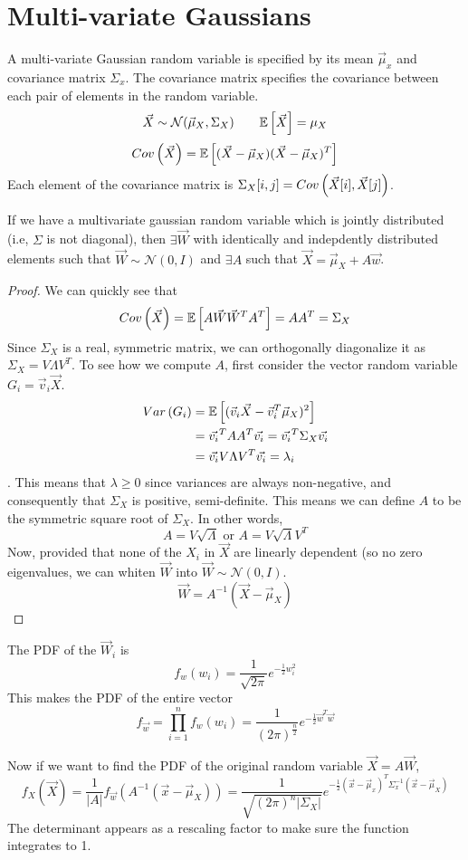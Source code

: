 \section{Multi-variate Gaussians}
A multi-variate Gaussian random variable is specified by its mean $\vec{\mu}_x$ and covariance matrix $\Sigma_x$. The covariance matrix specifies the covariance between each pair of elements in the random variable.
\[\vec{X}\sim\mathcal{N}(\vec{\mu}_X, \Sigma_X) \qquad \mathbb{E}\left[\vec{X}\right] = \mu_{X}\]
\[Cov\left(\vec{X}\right) = \mathbb{E}\left[(\vec{X}-\vec{\mu}_X)(\vec{X}-\vec{\mu}_X)^T\right]\]
Each element of the covariance matrix is $\Sigma_X[i, j] = Cov\left(\vec{X}[i], \vec{X}[j]\right)$.
\begin{theorem}
  If we have a multivariate gaussian random variable which is jointly distributed (i.e, $\Sigma$ is not diagonal), then $\exists \vec{W}$ with identically and indepdently distributed elements such that $\vec{W}\sim\mathcal{N}(0, I)$ and $\exists A$ such that $\vec{X} = \vec{\mu}_X+A\vec{w}$.
  \label{thm:mvn}
\end{theorem}
\begin{proof}
We can quickly see that
$$Cov\left(\vec{X}\right)=\mathbb{E}\left[A\vec{W}\vec{W}^TA^T\right] = AA^T=\Sigma_X$$
Since $\Sigma_X$ is a real, symmetric matrix, we can orthogonally diagonalize it as $\Sigma_X = V\Lambda V^T$. To see how we compute $A$, first consider the vector random variable $G_i=\vec{v}_i\vec{X}$.
\begin{align*}
  Var\left(G_i\right) &= \mathbb{E}\left[(\vec{v}_i\vec{X}-\vec{v}_i^T\vec{\mu}_X)^2\right] \\
  &= \vec{v_i}^TAA^T\vec{v_i} =\vec{v_i}^T\Sigma_X\vec{v_i}\\
  &= \vec{v_i}V\Lambda V^T\vec{v_i} = \lambda_i
\end{align*}.
This means that $\lambda \geq 0$ since variances are always non-negative, and consequently that $\Sigma_X$ is positive, semi-definite. This means we can define $A$ to be the symmetric square root of $\Sigma_X$. In other words,
\[
  A = V\sqrt{\Lambda} \text{ or } A = V\sqrt{\Lambda}V^T
\]
Now, provided that none of the $X_i$ in $\vec{X}$ are linearly dependent (so no zero eigenvalues, we can whiten $\vec{W}$ into $\vec{W}\sim\mathcal{N}(0, I)$.
\[
  \vec{W} = A^{-1}(\vec{X}-\vec{\mu}_X)
\]
\end{proof}
The PDF of the $\vec{W}_i$ is 
\[
  f_{w}(w_i)=\frac{1}{\sqrt{2\pi}}e^{-\frac{1}{2}w_i^2}
\]
This makes the PDF of the entire vector
\[
  f_{\vec{w}} = \prod_{i=1}^nf_w(w_i) = \frac{1}{(2\pi)^{\frac{n}{2}}}e^{-\frac{1}{2}\vec{w}^T\vec{w}}
\]

Now if we want to find the PDF of the original random variable $\vec{X} = A\vec{W}$,
\[
  f_{X}(\vec{X}) = \frac{1}{|A|}f_{\vec{w}}(A^{-1}(\vec{x}-\vec{\mu}_X)) = \frac{1}{\sqrt{(2\pi)^n|\Sigma_X|}}e^{-\frac{1}{2}(\vec{x}-\vec{\mu}_x)^T\Sigma_x^{-1}(\vec{x}-\vec{\mu}_X)}
\]
The determinant appears as a rescaling factor to make sure the function integrates to 1.

